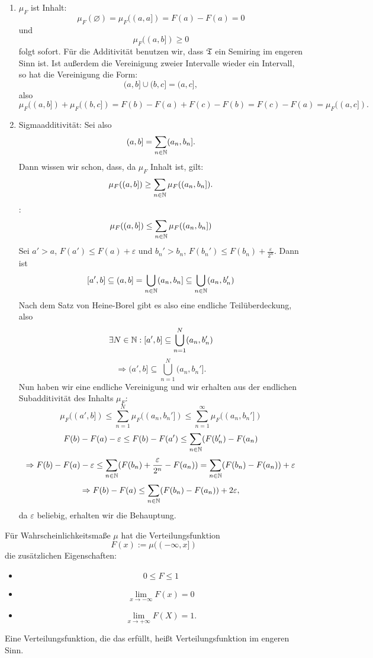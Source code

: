 			\begin{bew}$\text{  }$
				\begin{enumerate}
					\item $\mu_F$ ist Inhalt:\newline
					\[ \mu_F(\varnothing)=\mu_F((a,a])=F(a)-F(a)=0 \]
					und
					\[ \mu_F((a,b])\geq 0 \]
					folgt sofort. Für die Additivität benutzen wir, dass $\mathfrak{T}$ ein Semiring im engeren Sinn ist. Ist außerdem die Vereinigung zweier Intervalle wieder ein Intervall, so hat die Vereinigung die Form:
					\[ (a,b]\cup (b,c]=(a,c], \]
					also
					\[ \mu_F((a,b])+\mu_F((b,c])=F(b)-F(a)+F(c)-F(b)=F(c)-F(a)=\mu_F((a,c]). \]
					\item Sigmaadditivität:\newline
					Sei also 
					\[ (a,b]=\sum_{n\in\mathbb{N}} (a_n,b_n]. \]
					Dann wissen wir schon, dass, da $\mu_F$ Inhalt ist, gilt:
					\[ \mu_F((a,b])\ge\sum_{n\in\mathbb{N}} \mu_F((a_n,b_n]). \]
					\zz:
					\[ \mu_F((a,b])\le\sum_{n\in\mathbb{N}} \mu_F((a_n,b_n]) \]
					Sei $a'>a$, $F(a')\le F(a)+\varepsilon$ und $b_n'>b_n$, $F(b_n')\le F(b_n)+\frac{\varepsilon}{2^n}$. Dann ist
					\[ [a',b]\subseteq (a,b]=\bigcup_{n\in\mathbb{N}}(a_n,b_n]\subseteq \bigcup_{n\in\mathbb{N}} (a_n,b_n') \]
					Nach dem Satz von Heine-Borel gibt es also eine endliche Teilüberdeckung, also
					\[ \exists N\in\mathbb{N}: [a',b]\subseteq\bigcup_{n=1}^N(a_n,b_n') \]
					\[ \Rightarrow (a',b]\subseteq\bigcup_{n=1}^N (a_n,b_n']. \]
					Nun haben wir eine endliche Vereinigung und wir erhalten aus der endlichen Subadditivität des Inhalts $\mu_F$:
					\[ \mu_F((a',b])\le\sum_{n=1}^{N}\mu_F((a_n,b_n'])\le\sum_{n=1}^{\infty}\mu_F((a_n,b_n']) \]
					\[ F(b)-F(a)-\varepsilon\le F(b)-F(a')\le\sum_{n\in\mathbb{N}}(F(b_n')-F(a_n) \]
					\[ \Rightarrow F(b)-F(a)-\varepsilon\le\sum_{n\in\mathbb{N}} (F(b_n)+\frac{\varepsilon}{2^n}-F(a_n))=\sum_{n\in\mathbb{N}}(F(b_n)-F(a_n))+\varepsilon \]
					\[ \Rightarrow F(b)-F(a)\le \sum_{n\in\mathbb{N}}(F(b_n)-F(a_n))+2\varepsilon, \]
					da $\varepsilon$ beliebig, erhalten wir die Behauptung. 
					
				\end{enumerate}
			\end{bew}
			
			\begin{bem}
				Für Wahrscheinlichkeitsmaße $\mu$ hat die Verteilungsfunktion 
				\[ F(x):=\mu((-\infty,x]) \]
				die zusätzlichen Eigenschaften:
				\begin{itemize}
					\item
					\[ 0\le F\le 1 \]
					\item
					\[ \lim_{x\to-\infty}F(x)=0 \]
					\item
					\[ \lim_{x\to +\infty} F(X)=1. \]
				\end{itemize}
				Eine Verteilungsfunktion, die das erfüllt, heißt Verteilungsfunktion im engeren Sinn. 
			\end{bem}
			
